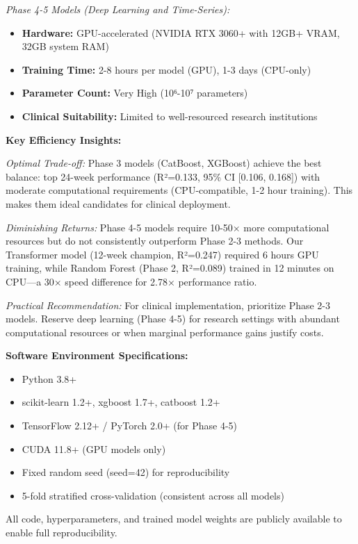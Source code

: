 \documentclass[conference]{IEEEtran}
\begin{document}
\textit{Phase 4-5 Models (Deep Learning and Time-Series):}
\begin{itemize}
    \item \textbf{Hardware:} GPU-accelerated (NVIDIA RTX 3060+ with 12GB+ VRAM, 32GB system RAM)
    \item \textbf{Training Time:} 2-8 hours per model (GPU), 1-3 days (CPU-only)
    \item \textbf{Parameter Count:} Very High (10⁶-10⁷ parameters)
    \item \textbf{Clinical Suitability:} Limited to well-resourced research institutions
\end{itemize}

\textbf{Key Efficiency Insights:}

\textit{Optimal Trade-off:} Phase 3 models (CatBoost, XGBoost) achieve the best balance: top 24-week performance (R²=0.133, 95\% CI [0.106, 0.168]) with moderate computational requirements (CPU-compatible, 1-2 hour training). This makes them ideal candidates for clinical deployment.

\textit{Diminishing Returns:} Phase 4-5 models require 10-50× more computational resources but do not consistently outperform Phase 2-3 methods. Our Transformer model (12-week champion, R²=0.247) required 6 hours GPU training, while Random Forest (Phase 2, R²=0.089) trained in 12 minutes on CPU—a 30× speed difference for 2.78× performance ratio.

\textit{Practical Recommendation:} For clinical implementation, prioritize Phase 2-3 models. Reserve deep learning (Phase 4-5) for research settings with abundant computational resources or when marginal performance gains justify costs.

\textbf{Software Environment Specifications:}
\begin{itemize}
    \item Python 3.8+
    \item scikit-learn 1.2+, xgboost 1.7+, catboost 1.2+
    \item TensorFlow 2.12+ / PyTorch 2.0+ (for Phase 4-5)
    \item CUDA 11.8+ (GPU models only)
    \item Fixed random seed (seed=42) for reproducibility
    \item 5-fold stratified cross-validation (consistent across all models)
\end{itemize}

All code, hyperparameters, and trained model weights are publicly available to enable full reproducibility.
\end{document}
